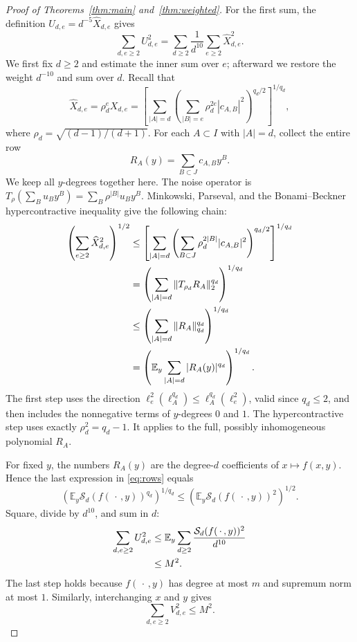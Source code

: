 \documentclass[11pt]{amsart}
\theoremstyle{remark}
\numberwithin{equation}{section}
\newcommand{\E}{\mathbb E}
\begin{document}
\begin{proof}[Proof of Theorems~\ref{thm:main} and~\ref{thm:weighted}]
For the first sum, the definition $U_{d,e}=d^{-5}\widehat X_{d,e}$ gives
\[
\sum_{d,e\ge2}U_{d,e}^2
=\sum_{d\ge2}\frac1{d^{10}}\sum_{e\ge2}\widehat X_{d,e}^2.
\]
We first fix $d\ge2$ and estimate the inner sum over $e$; afterward we
restore the weight $d^{-10}$ and sum over $d$. Recall that
\[
\widehat X_{d,e}=\rho_d^eX_{d,e}
=\left[\sum_{|A|=d}
\left(\sum_{|B|=e}\rho_d^{2e}|c_{A,B}|^2\right)^{q_d/2}\right]^{1/q_d},
\]
where $\rho_d=\sqrt{(d-1)/(d+1)}$.
For each $A\subset I$ with $|A|=d$, collect the entire row
\[
R_A(y)=\sum_{B\subset J}c_{A,B}y^B.
\]
We keep all $y$-degrees together here. The noise operator is
$T_\rho(\sum_B u_By^B)=\sum_B\rho^{|B|}u_By^B$.
Minkowski, Parseval, and the Bonami--Beckner hypercontractive
inequality \cite{Bonami70,Beckner75} give the following chain:
\begin{align}
\left(\sum_{e\ge2}\widehat X_{d,e}^2\right)^{1/2}
&\le\left[\sum_{|A|=d}
\left(\sum_{B\subset J}\rho_d^{2|B|}|c_{A,B}|^2\right)^{q_d/2}
\right]^{1/q_d}\notag\\
&=\left(\sum_{|A|=d}\|T_{\rho_d}R_A\|_2^{q_d}\right)^{1/q_d}\notag\\
&\le\left(\sum_{|A|=d}\|R_A\|_{q_d}^{q_d}\right)^{1/q_d}\notag\\
&=\left(\E_y\sum_{|A|=d}|R_A(y)|^{q_d}\right)^{1/q_d}.
\label{eq:rows}
\end{align}
The first step uses the direction
$\ell_e^2(\ell_A^{q_d})\le\ell_A^{q_d}(\ell_e^2)$, valid since $q_d\le2$,
and then includes the nonnegative terms of $y$-degrees $0$ and $1$.
The hypercontractive step uses exactly $\rho_d^2=q_d-1$.
It applies to the full, possibly inhomogeneous polynomial $R_A$.

For fixed $y$, the numbers $R_A(y)$ are the degree-$d$ coefficients of
$x\mapsto f(x,y)$. Hence the last expression in \eqref{eq:rows} equals
\[
\left(\E_y \mathcal{S}_{d}(f(\,\cdot\,,y))^{q_d}\right)^{1/q_d}
\le\left(\E_y \mathcal{S}_{d}(f(\,\cdot\,,y))^2\right)^{1/2}.
\]
Square, divide by $d^{10}$, and sum in $d$:
\begin{align}
\sum_{d,e\ge2}U_{d,e}^2
&\le\E_y\sum_{d\ge2}
\frac{\mathcal{S}_{d}(f(\,\cdot\,,y))^2}{d^{10}}\notag\\
&\le M^2.
\label{eq:rowbound}
\end{align}
The last step holds because $f(\,\cdot\,,y)$ has degree at most $m$ and
supremum norm at most $1$. Similarly, interchanging $x$ and $y$ gives
\begin{equation}
\sum_{d,e\ge2}V_{d,e}^2\le M^2.
\label{eq:colbound}
\end{equation}


\end{proof}
\end{document}
